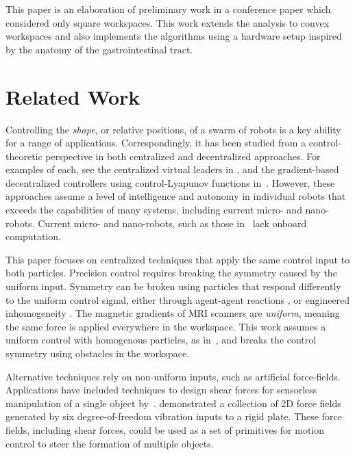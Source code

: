 This paper is an elaboration of preliminary work in a conference paper \cite{shahrokhi2017algorithms} which considered only square workspaces. This work extends the analysis to convex workspaces and also implements the algorithms using a hardware setup inspired by the anatomy of the gastrointestinal tract.



\section{Related Work}\label{sec:RelatedWork}

Controlling the \emph{shape}, or relative positions, of a swarm of robots is a key ability for a range of applications.  Correspondingly, it has been studied from a control-theoretic perspective in  both centralized and decentralized approaches. For examples of each, see the centralized virtual leaders in \cite{egerstedt2001formation}, and the  gradient-based decentralized controllers  using control-Lyapunov functions in~\cite{hsieh2008decentralized}. However, these approaches assume a level of intelligence and autonomy in individual robots that exceeds the capabilities of many systems, including current micro- and nano-robots.  Current micro- and nano-robots, such as those in~\cite{Chowdhury2015,martel2015magnetotactic,Xiaohui2015magnetiteMicroswimmers} lack onboard computation.

This paper focuses on centralized techniques that apply the same control input to both particles. 
Precision control requires breaking the symmetry caused by the uniform input.  
Symmetry can be broken using particles that respond differently to the uniform control signal, either through agent-agent reactions \cite{bertozzi2015ring}, or engineered inhomogeneity  \cite{Donald2013,bretl2007,beckerIJRR2014}. 
 The magnetic gradients of MRI scanners are \emph{uniform}, meaning the same force is applied everywhere in the workspace\cite{nosrati2018development}.
 This work assumes a uniform control with homogenous particles, as in~\cite{AaronManipulation2013}, and breaks the control symmetry using obstacles in the workspace. 


Alternative techniques rely on non-uniform inputs, such as artificial force-fields.
Applications have included techniques to design shear forces for sensorless manipulation of a single object by~\cite{lamiraux+2001:ra}.  
\cite{vose2012sliding} demonstrated a collection of 2D force fields generated by six degree-of-freedom vibration inputs to a rigid plate.  These force fields, including shear forces, could be used as a set of primitives for motion control to steer the formation of multiple objects. %

